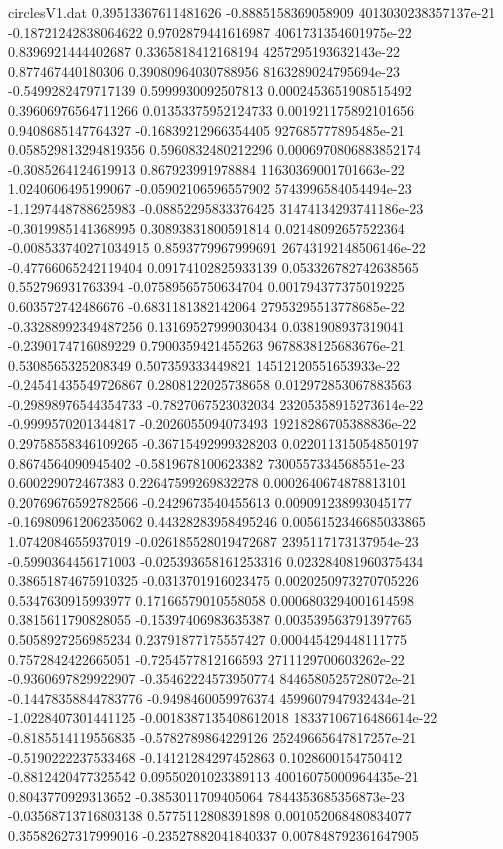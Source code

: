 \begin{filecontents}{circlesV1.dat}
0.39513367611481626	-0.8885158369058909	4013030238357137e-21
-0.18721242838064622	0.9702879441616987	4061731354601975e-22
0.8396921444402687	0.3365818412168194	4257295193632143e-22
0.877467440180306	0.39080964030788956	8163289024795694e-23
-0.5499282479717139	0.5999930092507813	0.0002453651908515492
0.39606976564711266	0.01353375952124733	0.001921175892101656
0.9408685147764327	-0.16839212966354405	927685777895485e-21
0.058529813294819356	0.5960832480212296	0.0006970806883852174
-0.3085264124619913	0.867923991978884	11630369001701663e-22
1.0240606495199067	-0.05902106596557902	5743996584054494e-23
-1.1297448788625983	-0.08852295833376425	31474134293741186e-23
-0.3019985141368995	0.30893831800591814	0.02148092657522364
-0.008533740271034915	0.8593779967999691	26743192148506146e-22
-0.47766065242119404	0.09174102825933139	0.053326782742638565
0.552796931763394	-0.07589565750634704	0.001794377375019225
0.603572742486676	-0.6831181382142064	27953295513778685e-22
-0.33288992349487256	0.13169527999030434	0.0381908937319041
-0.2390174716089229	0.7900359421455263	9678838125683676e-21
0.5308565325208349	0.507359333449821	14512120551653933e-22
-0.24541435549726867	0.2808122025738658	0.012972853067883563
-0.29898976544354733	-0.7827067523032034	23205358915273614e-22
-0.9999570201344817	-0.2026055094073493	19218286705388836e-22
0.29758558346109265	-0.36715492999328203	0.022011315054850197
0.8674564090945402	-0.5819678100623382	7300557334568551e-23
0.600229072467383	0.22647599269832278	0.0002640674878813101
0.20769676592782566	-0.2429673540455613	0.009091238993045177
-0.16980961206235062	0.44328283958495246	0.0056152346685033865
1.0742084655937019	-0.026185528019472687	2395117173137954e-23
-0.5990364456171003	-0.025393658161253316	0.023284081960375434
0.38651874675910325	-0.0313701916023475	0.0020250973270705226
0.5347630915993977	0.17166579010558058	0.0006803294001614598
0.3815611790828055	-0.15397406983635387	0.003539563791397765
0.5058927256985234	0.23791877175557427	0.000445429448111775
0.7572842422665051	-0.7254577812166593	2711129700603262e-22
-0.9360697829922907	-0.35462224573950774	8446580525728072e-21
-0.14478358844783776	-0.9498460059976374	4599607947932434e-21
-1.0228407301441125	-0.0018387135408612018	18337106716486614e-22
-0.8185514119556835	-0.5782789864229126	25249665647817257e-21
-0.5190222237533468	-0.14121284297452863	0.1028600154750412
-0.8812420477325542	0.09550201023389113	40016075000964435e-21
0.8043770929313652	-0.3853011709405064	7844353685356873e-23
-0.03568713716803138	0.5775112808391898	0.001052068480834077
0.35582627317999016	-0.23527882041840337	0.007848792361647905

\end{filecontents}
